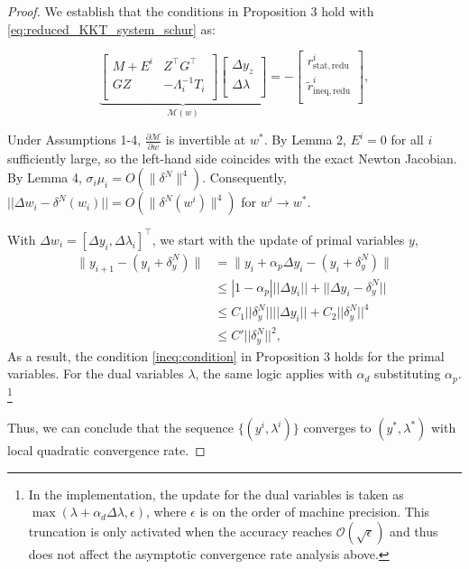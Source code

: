 \documentclass[conference]{IEEEtran}
\theoremstyle{plain}
\begin{document}
\begin{proof}
    We establish that the conditions in Proposition 3 hold with \ref{eq:reduced_KKT_system_schur} as:

    \begin{equation}
        \underbrace{
            \begin{bmatrix}
            M + E^i & Z^\top G^\top\\
            GZ & -\Lambda_i^{-1}T_i\\
            \end{bmatrix}
            \begin{bmatrix}
            \Delta y_z \\
            \Delta \lambda \\
            \end{bmatrix}
        }_{\mathcal{M}(w)} = -
        \begin{bmatrix}
        r_{\mathrm{stat, redu}}^i \\
        \tilde{r}_{\mathrm{ineq, redu}}^i \\
        \end{bmatrix},
    \end{equation}

    Under Assumptions 1-4, $\frac{\partial \mathcal{M}}{\partial w}$ is invertible at $w^*$.
    By Lemma 2, $E^i=0$ for all $i$ sufficiently large,
    so the left-hand side coincides with the exact Newton Jacobian.
    By Lemma 4,
    $\sigma_i\mu_i = O(\|\delta^N\|^4)$. Consequently,$||\Delta w_i - \delta^N(w_i)|| = O(\|\delta^N(w^i)\|^4)$ for $w^i \to w^*$.

    With $\Delta w_i = [\Delta y_i, \Delta \lambda_i]^\top$, we start with the update of primal variables $y$,
    \begin{align}
        \|y_{i+1} - (y_i+ \delta^N_y)\| &=  \|y_{i}+ \alpha_p \Delta y_i - (y_i+ \delta^N_y)\| \\
                                      &\le |1 - \alpha_p| ||\Delta y_i|| + ||\Delta y_i - \delta^N_y||\\
                                      &\le C_1 ||\delta^N_y|| ||\Delta y_i|| + C_2 ||\delta^N_y||^4 \\
                                      &\le C' ||\delta^N_y||^2,
    \end{align}
    As a result, the condition \ref{ineq:condition} in Proposition 3 holds for the primal variables.
    For the dual variables $\lambda$, the same logic applies with $\alpha_d$ substituting $\alpha_p$.
    \footnote{In the implementation, 
    the update for the dual variables is taken as $\max(\lambda+\alpha_d\Delta\lambda, \epsilon)$, 
    where $\epsilon$ is on the order of machine precision.
    This truncation is only activated when the accuracy reaches $\mathcal{O}(\sqrt{\epsilon})$ and thus does not affect the asymptotic convergence rate analysis above.}

    Thus, we can conclude that the sequence $\{(y^i, \lambda^i)\}$ converges to $(y^*, \lambda^*)$ with local quadratic convergence rate.
\end{proof}



\end{document}
